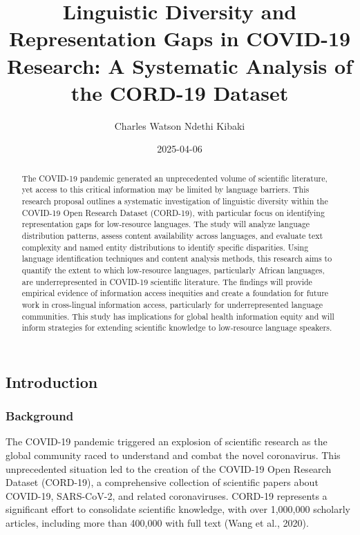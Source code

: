 \documentclass[
]{article}
\title{Linguistic Diversity and Representation Gaps in COVID-19
Research: A Systematic Analysis of the CORD-19 Dataset}
\author{Charles Watson Ndethi Kibaki}
\date{2025-04-06}
\renewcommand*\contentsname{Table of contents}
\newcommand\contentsname{Table of contents}
\begin{document}
\maketitle
\begin{abstract}
The COVID-19 pandemic generated an unprecedented volume of scientific
literature, yet access to this critical information may be limited by
language barriers. This research proposal outlines a systematic
investigation of linguistic diversity within the COVID-19 Open Research
Dataset (CORD-19), with particular focus on identifying representation
gaps for low-resource languages. The study will analyze language
distribution patterns, assess content availability across languages, and
evaluate text complexity and named entity distributions to identify
specific disparities. Using language identification techniques and
content analysis methods, this research aims to quantify the extent to
which low-resource languages, particularly African languages, are
underrepresented in COVID-19 scientific literature. The findings will
provide empirical evidence of information access inequities and create a
foundation for future work in cross-lingual information access,
particularly for underrepresented language communities. This study has
implications for global health information equity and will inform
strategies for extending scientific knowledge to low-resource language
speakers.
\end{abstract}

\renewcommand*\contentsname{Table of Contents}
{
\hypersetup{linkcolor=}
\setcounter{tocdepth}{3}
\tableofcontents
}

\subsection{Introduction}\label{introduction}

\subsubsection{Background}\label{background}

The COVID-19 pandemic triggered an explosion of scientific research as
the global community raced to understand and combat the novel
coronavirus. This unprecedented situation led to the creation of the
COVID-19 Open Research Dataset (CORD-19), a comprehensive collection of
scientific papers about COVID-19, SARS-CoV-2, and related coronaviruses.
CORD-19 represents a significant effort to consolidate scientific
knowledge, with over 1,000,000 scholarly articles, including more than
400,000 with full text (Wang et al., 2020).
\end{document}
